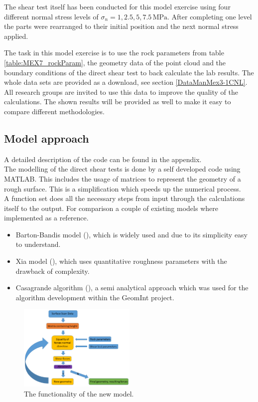 The shear test itself has been conducted for this model exercise using four different normal stress levels of $\sigma_n=1,2.5,5,7.5\,\text{MPa}$. After completing one level the parts were rearranged to their initial position and the next normal stress applied.

The task in this model exercise is to use the rock parameters from table \ref{table:MEX7_rockParam}, the geometry data of the point cloud and the boundary conditions of the direct shear test to back calculate the lab results. The whole data sets are provided as a download, see section \ref{DataManMex3-1CNL}. All research groups are invited to use this data to improve the quality of the calculations. The shown results will be provided as well to make it easy to compare different methodologies.
\subsection{Model approach}
A detailed description of the code can be found in the appendix.\\
The modelling of the direct shear tests is done by a self developed code using MATLAB. This includes the usage of matrices to represent the geometry of a rough surface. This is a simplification which speeds up the numerical process.\\ 
A function set does all the necessary steps from input through the calculations itself to the output. For comparison a couple of existing models where implemented as a reference.\\
\begin{itemize}
\item Barton-Bandis model (\cite{BartonBandis1985}), which is widely used and due to its simplicity easy to understand.
\item Xia model (\cite{Xia2014}), which uses quantitative roughness parameters with the drawback of complexity.
\item Casagrande algorithm (\cite{Casagrande2017}), a semi analytical approach which was used for the algorithm development within the GeomInt project.
\end{itemize}

\begin{figure}[!ht]
\begin{center}
\includegraphics[width=0.5\textwidth]{./figures/MEX7_Scheme.png}
\end{center}
\caption{The functionality of the new model.}
\label{fig:MEX7_calculationScheme}
\end{figure}

